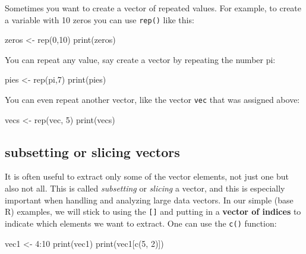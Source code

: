 \documentclass[
  letterpaper,
  DIV=11,
  numbers=noendperiod]{scrreprt}
\newenvironment{Shaded}{\begin{snugshade}}{\end{snugshade}}
\newcommand{\NormalTok}[1]{\textcolor[rgb]{0.00,0.23,0.31}{#1}}
\begin{document}
Sometimes you want to create a vector of repeated values. For example,
to create a variable with 10 zeros you can use \texttt{rep()} like this:

\begin{Shaded}
\begin{Highlighting}[]
\NormalTok{zeros \textless{}{-} rep(0,10)}
\NormalTok{print(zeros)}
\end{Highlighting}
\end{Shaded}

You can repeat any value, say create a vector by repeating the number
pi:

\begin{Shaded}
\begin{Highlighting}[]
\NormalTok{pies \textless{}{-} rep(pi,7)}
\NormalTok{print(pies)}
\end{Highlighting}
\end{Shaded}

You can even repeat another vector, like the vector \texttt{vec} that
was assigned above:

\begin{Shaded}
\begin{Highlighting}[]
\NormalTok{vecs \textless{}{-} rep(vec, 5)}
\NormalTok{print(vecs)}
\end{Highlighting}
\end{Shaded}

\hypertarget{subsetting-or-slicing-vectors}{%
\subsection*{subsetting or slicing
vectors}\label{subsetting-or-slicing-vectors}}

It is often useful to extract only some of the vector elements, not just
one but also not all. This is called \emph{subsetting} or \emph{slicing}
a vector, and this is especially important when handling and analyzing
large data vectors. In our simple (base R) examples, we will stick to
using the \texttt{{[}{]}} and putting in a \textbf{vector of indices} to
indicate which elements we want to extract. One can use the \texttt{c()}
function:

\begin{Shaded}
\begin{Highlighting}[]
\NormalTok{vec1 \textless{}{-} 4:10}
\NormalTok{print(vec1)}
\NormalTok{print(vec1[c(5, 2)])}
\end{Highlighting}
\end{Shaded}
\end{document}
